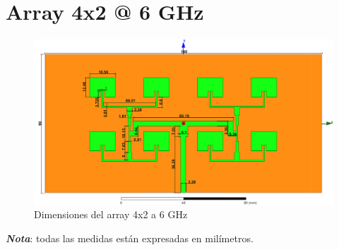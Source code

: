 \section{Array 4x2 @ 6 GHz}
\vfill
\begin{figure}[H]
   	 \centering
        \includegraphics[width=18cm ,height=\textwidth, keepaspectratio=true, angle=90,origin=c]{archivos/desarrollo/autocad/95}
        \caption{Dimensiones del array 4x2 a 6 GHz}
        \label{fig:4x22}
\end{figure}

\vfill
\textit{\textbf{Nota}}: todas las medidas están expresadas en milímetros.
\newpage


